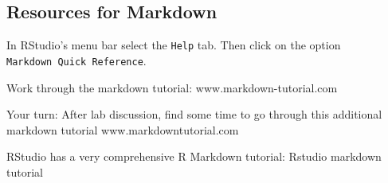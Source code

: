 \documentclass[
]{book}
\begin{document}
\hypertarget{resources-for-markdown}{%
\subsection{Resources for Markdown}\label{resources-for-markdown}}

In RStudio's menu bar select the \texttt{Help} tab. Then click on the option
\texttt{Markdown\ Quick\ Reference}.

Work through the markdown tutorial:
www.markdown-tutorial.com

Your turn: After lab discussion, find some time to go through this
additional markdown tutorial
www.markdowntutorial.com

RStudio has a very comprehensive R Markdown tutorial:
Rstudio markdown tutorial

  
\end{document}
